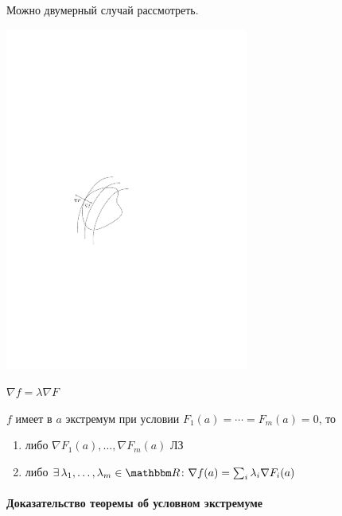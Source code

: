 \documentclass[12pt,timbord]{../../../notes}
\begin{document}
\begin{exmp*}
  Можно двумерный случай рассмотреть.
  
  \begin{minipage}{0.48\linewidth}
    \noindent\includegraphics[width=0.6\textwidth]{condextr2d}
  \end{minipage} \hfill
  \begin{minipage}{0.48\linewidth}
    $\nabla f = \lambda \nabla F$
  \end{minipage}
\end{exmp*}

\begin{cor}
  $f$ имеет в $a$ экстремум при условии $F_1(a) = \cdots = F_m(a) = 0$, то
  \begin{enumerate}
    \item либо $\nabla F_1(a), \dotsc, \nabla F_m(a)$ ЛЗ
    \item либо $\exists\, \lambda_1, \dotsc, \lambda_m \in \R \colon \nabla f(a) =
      \sum_i \lambda_i \nabla F_i(a)$ 
  \end{enumerate}
\end{cor}

\paragraph{Доказательство теоремы об условном экстремуме}
\label{par:diffspace::condextrema} 
\end{document}
